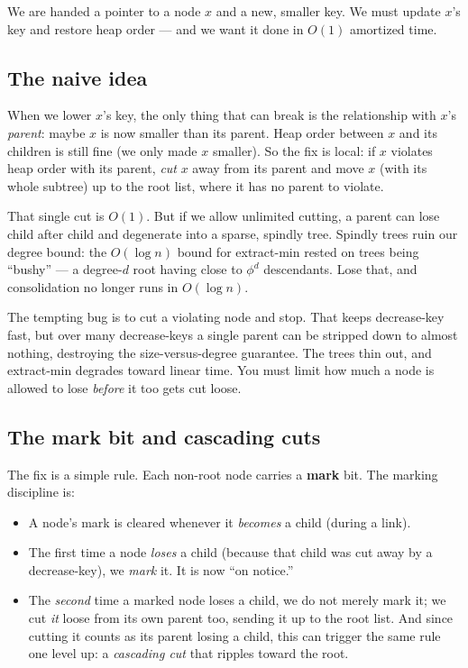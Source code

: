 We are handed a pointer to a node $x$ and a new, smaller
key. We must update $x$'s key and restore heap order --- and we want it done in
$O(1)$ amortized time.

\subsection{The naive idea}

When we lower $x$'s key, the only thing that can break is the relationship with
$x$'s \emph{parent}: maybe $x$ is now smaller than its parent. Heap order between
$x$ and its children is still fine (we only made $x$ smaller). So the fix is local:
if $x$ violates heap order with its parent, \emph{cut} $x$ away from its parent and
move $x$ (with its whole subtree) up to the root list, where it has no parent to
violate.

That single cut is $O(1)$. But if we allow
unlimited cutting, a parent can lose child after child and degenerate into a
sparse, spindly tree. Spindly trees ruin our degree bound: the
$O(\log n)$ bound for extract-min rested on trees being ``bushy'' --- a degree-$d$
root having close to $\phi^d$ descendants. Lose that, and consolidation no longer
runs in $O(\log n)$.

\begin{trapbox}
The tempting bug is to cut a violating node and stop. That keeps decrease-key
fast, but over many decrease-keys a single parent can be stripped down to almost
nothing, destroying the size-versus-degree guarantee. The trees thin out, and
extract-min degrades toward linear time. You must limit how much a node is allowed to lose
\emph{before} it too gets cut loose.
\end{trapbox}

\subsection{The mark bit and cascading cuts}

The fix is a simple rule. Each non-root node
carries a \textbf{mark} bit. The marking discipline is:

\begin{itemize}
  \item A node's mark is cleared whenever it \emph{becomes} a child (during a
        link).
  \item The first time a node \emph{loses} a child (because that child was cut
        away by a decrease-key), we \emph{mark} it. It is now ``on notice.''
  \item The \emph{second} time a marked node loses a child, we do not merely mark it;
        we cut \emph{it} loose from its own parent too, sending it up to the
        root list. And since cutting it counts as its parent losing a child, this
        can trigger the same rule one level up: a \emph{cascading cut} that ripples
        toward the root.
\end{itemize}

